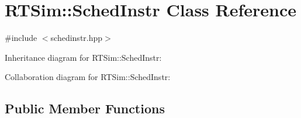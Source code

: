 \hypertarget{classRTSim_1_1SchedInstr}{}\section{R\+T\+Sim\+:\+:Sched\+Instr Class Reference}
\label{classRTSim_1_1SchedInstr}


{\ttfamily \#include $<$schedinstr.\+hpp$>$}



Inheritance diagram for R\+T\+Sim\+:\+:Sched\+Instr\+:


Collaboration diagram for R\+T\+Sim\+:\+:Sched\+Instr\+:
\subsection*{Public Member Functions}
